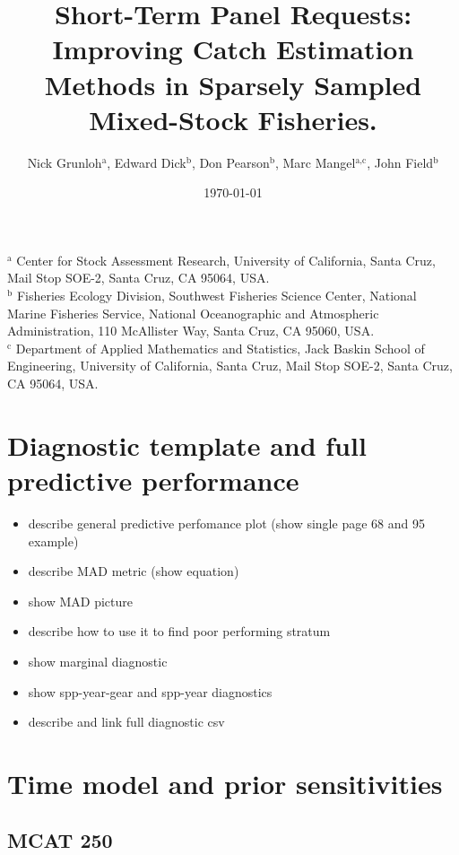 \documentclass[12pt]{article}
\begin{document}
%
\title{Short-Term Panel Requests: Improving Catch Estimation Methods in Sparsely Sampled Mixed-Stock Fisheries.}
\author{Nick Grunloh$^\text{a}$, Edward Dick$^\text{b}$, Don Pearson$^\text{b}$, Marc Mangel$^\text{a,c}$, John Field$^\text{b}$}
\date{\today}
\maketitle
\noindent
$^\text{a}$ Center for Stock Assessment Research, University of California, Santa Cruz, Mail Stop SOE-2, Santa Cruz, CA 95064, USA.\\
$^\text{b}$ Fisheries Ecology Division, Southwest Fisheries Science Center, National Marine Fisheries Service, National Oceanographic and Atmospheric Administration, 110 McAllister Way, Santa Cruz, CA 95060, USA.\\
$^\text{c}$ Department of Applied Mathematics and Statistics, Jack Baskin School of Engineering, University of California, Santa Cruz, Mail Stop SOE-2, Santa Cruz, CA 95064, USA.

%
\clearpage
%
\section{Diagnostic template and full predictive performance}

\begin{itemize}
	\item describe general predictive perfomance plot (show single page 68 and 95 example)
	\item describe MAD metric (show equation)
	\item show MAD picture
	\item describe how to use it to find poor performing stratum
	\item show marginal diagnostic
	\item show spp-year-gear and spp-year diagnostics
	\item describe and link full diagnostic csv
\end{itemize}

%
\clearpage
%
\section{Time model and prior sensitivities}

\subsection{MCAT 250}
\end{document}
